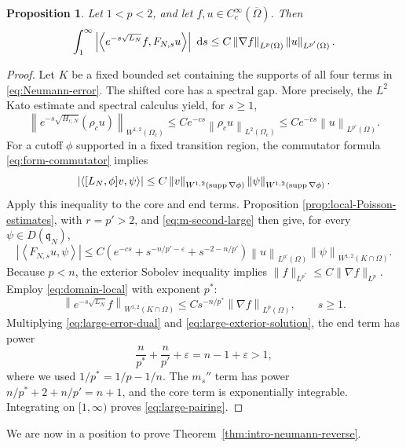 \documentclass[12pt]{amsart}
\newcommand\dd{\,{\rm d}}
\newcommand{\supp}{{\rm supp}{\hspace{.05cm}}}
\newcommand{\ip}[2]{\left\langle #1,#2\right\rangle}
\newcommand{\norm}[2]{\left\lVert #1\right\rVert_{#2}}
\newcommand{\abs}[1]{\left\lvert #1\right\rvert}
\newtheorem{proposition}[theorem]{Proposition}
\theoremstyle{remark}
\begin{document}
\begin{proposition}\label{prop:large-pairing}
Let $1<p<2$, and let
$f,u\in C_c^\infty(\overline\Omega)$.  Then
\begin{equation}\label{eq:large-pairing}
 \int_1^\infty\abs{\ip{e^{-s\sqrt{L_N}}f}{F_{N,s}u}}\,\dd s
 \leq C\norm{\nabla f}{L^p(\Omega)}\norm u{L^{p'}(\Omega)}.
\end{equation}
\end{proposition}

\begin{proof}
Let $K$ be a fixed bounded set containing the supports of all four terms in
\eqref{eq:Neumann-error}.  The shifted core has a spectral gap.  More
precisely, the $L^2$ Kato estimate and spectral calculus yield, for $s\geq1$,
\[
 \norm{e^{-s\sqrt{H_{c,N}}}(\rho_cu)}{W^{1,2}(\Omega_c)}
 \leq Ce^{-cs}\norm{\rho_cu}{L^2(\Omega_c)}
 \leq Ce^{-cs}\norm u{L^{p'}(\Omega)}.
\]
For a cutoff $\phi$ supported in a fixed transition region, the commutator
formula \eqref{eq:form-commutator} implies
\[
 \abs{\ip{[L_N,\phi]v}{\psi}}
 \leq C\norm v{W^{1,2}(\supp\nabla\phi)}
          \norm\psi{W^{1,2}(\supp\nabla\phi)}.
\]
Apply this inequality to the core and end terms.  Proposition
\ref{prop:local-Poisson-estimates}, with $r=p'>2$, and \eqref{eq:m-second-large} then give, for every \(\psi\in D(\mathfrak q_N)\),
\begin{equation}\label{eq:large-error-dual}
 \abs{\ip{F_{N,s}u}{\psi}}
 \leq C\left(e^{-cs}+s^{-n/p'-\varepsilon}
                  +s^{-2-n/p'}\right)
 \norm u{L^{p'}(\Omega)}
 \norm\psi{W^{1,2}(K\cap\Omega)}.
\end{equation}
Because \(p<n\), the exterior Sobolev inequality implies
$\|f\|_{L^{p^*}}\leq C\|\nabla f\|_{L^p}$.  Employ
\eqref{eq:domain-local} with exponent $p^*$:
\begin{equation}\label{eq:large-exterior-solution}
 \norm{e^{-s\sqrt{L_N}}f}{W^{1,2}(K\cap\Omega)}
 \leq Cs^{-n/p^*}\norm{\nabla f}{L^p(\Omega)},\qquad s\geq1.
\end{equation}
Multiplying \eqref{eq:large-error-dual} and
\eqref{eq:large-exterior-solution}, the end term has power
\[
 \frac n{p^*}+\frac n{p'}+\varepsilon
 =n-1+\varepsilon>1,
\]
where we used $1/p^*=1/p-1/n$.  The $m_s''$ term has power
$n/p^*+2+n/p'=n+1$, and the core term is exponentially integrable.
Integrating on $[1,\infty)$ proves \eqref{eq:large-pairing}.
\end{proof}


We are now in a position to prove Theorem~\ref{thm:intro-neumann-reverse}.
\end{document}
